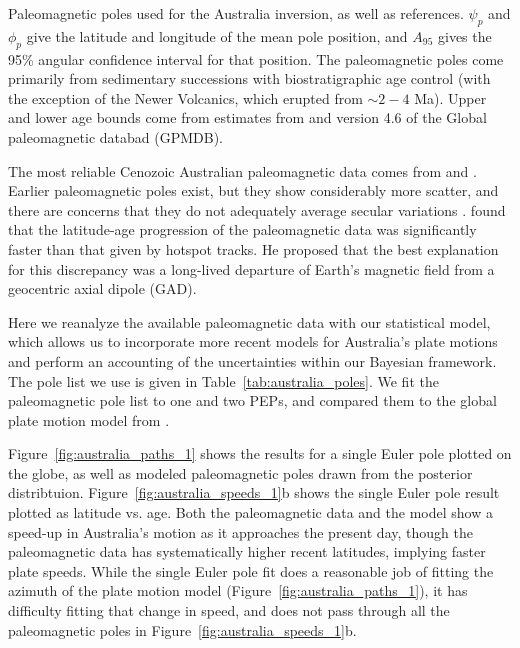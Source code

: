 \documentclass[preprint,12pt,authoryear]{elsarticle}
\begin{document}
\begin{table}
\scriptsize

\caption[Paleomagnetic poles used for the Australia inversion.]{Paleomagnetic poles used for the Australia inversion, as well as references. 
$\psi_p$ and $\phi_p$ give the latitude and longitude of the mean pole position, and $A_{95}$ gives the 95\% angular confidence interval for that position.
The paleomagnetic poles come primarily from sedimentary successions with biostratigraphic age control 
(with the exception of the Newer Volcanics, which erupted from $\sim2-4$ Ma).
Upper and lower age bounds come from estimates from \citet{idnurm1985lateI} and version 4.6 of the Global paleomagnetic databad (GPMDB). }
\label{tab:australia_poles}
\end{table}

The most reliable Cenozoic Australian paleomagnetic data comes from \citet{idnurm1985lateI} and \citet{idnurm1994new}.
Earlier paleomagnetic poles exist, but they show considerably more scatter,
and there are concerns that they do not adequately average secular variations
\citep{idnurm1985lateI, klootwijk2009sedimentary}.
\citet{idnurm1985lateII} found that the latitude-age progression of the paleomagnetic
data was significantly faster than that given by hotspot tracks.
He proposed that the best explanation for this discrepancy was a long-lived
departure of Earth's magnetic field from a geocentric axial dipole (GAD).

Here we reanalyze the available paleomagnetic data with our statistical model,
which allows us to incorporate more recent models for Australia's plate motions
and perform an accounting of the uncertainties within our Bayesian framework.
The pole list we use is given in Table~\ref{tab:australia_poles}.
We fit the paleomagnetic pole list to one and two PEPs, and compared them
to the global plate motion model from \citet{seton2012global}.

Figure~\ref{fig:australia_paths_1} shows the results for a single Euler pole
plotted on the globe, as well as modeled paleomagnetic poles drawn from the posterior distribtuion. 
Figure~\ref{fig:australia_speeds_1}b shows the single Euler pole result plotted as latitude vs. age.
Both the paleomagnetic data and the \citet{seton2012global} model show a speed-up in
Australia's motion as it approaches the present day, though the paleomagnetic data
has systematically higher recent latitudes, implying faster plate speeds.
While the single Euler pole fit does a reasonable job of fitting the azimuth of the plate motion model 
(Figure~\ref{fig:australia_paths_1}), it has difficulty fitting that change in speed, 
and does not pass through all the paleomagnetic poles in Figure~\ref{fig:australia_speeds_1}b.
\end{document}

